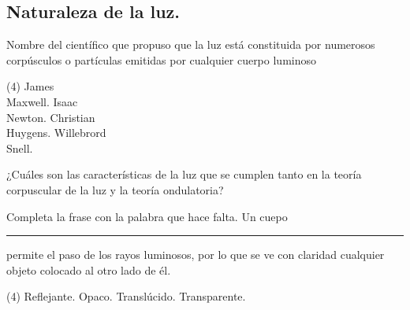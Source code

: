 \documentclass[12pt, letter]{exam}
\begin{document}


\newpage

\begin{questions}
    
    \section{Naturaleza de la luz.}
    
    \question Nombre del científico que propuso que la luz está constituida por numerosos corpúsculos o partículas emitidas por cualquier cuerpo luminoso
    \begin{tasks}(4)
        \task James \\ Maxwell.
        \task Isaac \\ Newton.
        \task Christian \\ Huygens.
        \task Willebrord \\ Snell.
    \end{tasks}
    \question ¿Cuáles son las características de la luz que se cumplen tanto en la teoría corpuscular de la luz y la teoría ondulatoria?
    \question Completa la frase con la palabra que hace falta. Un cuepo \rule{2cm}{0.1mm} permite el paso de los rayos luminosos, por lo que se ve con claridad cualquier objeto colocado al otro lado de él.
    \begin{tasks}(4)
        \task Reflejante.
        \task Opaco.
        \task Translúcido.
        \task Transparente.
    \end{tasks}
    

\end{questions}
\end{document}
